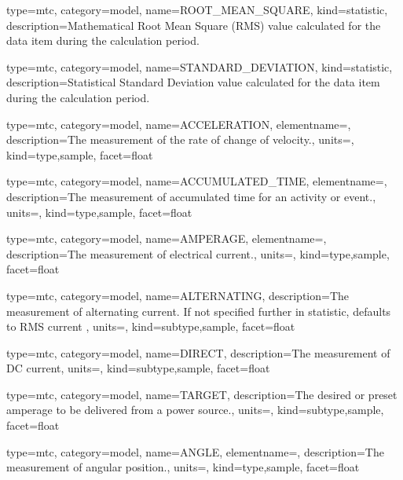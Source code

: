 {
  type=mtc,
  category=model,
  name={ROOT\_MEAN\_SQUARE},
  kind={statistic},
  description={Mathematical Root Mean Square (RMS) value calculated for the data item during the calculation period.}
}


{
  type=mtc,
  category=model,
  name={STANDARD\_DEVIATION},
  kind={statistic},
  description={Statistical Standard Deviation value calculated for the data item during the calculation period.}
}


{
  type=mtc,
  category=model,
  name={ACCELERATION},
  elementname=,
  description={The measurement of the rate of change of velocity.},
  units=,
  kind={type,sample},
  facet={\gls{float}}
}


{
  type=mtc,
  category=model,
  name={ACCUMULATED\_TIME},
  elementname=,
  description={The measurement of accumulated time for an activity or event.},
  units=,
  kind={type,sample},
  facet={\gls{float}}
}


{
  type=mtc,
  category=model,
  name={AMPERAGE},
  elementname=,
  description={The measurement of electrical current.},
  units=,
  kind={type,sample},
  facet={\gls{float}}
}



{
  type=mtc,
  category=model,
  name={ALTERNATING},
  description={The measurement of alternating current.   If not specified further in statistic, defaults to RMS current  },
  units=,
  kind={subtype,sample},
  facet={\gls{float}}
}


{
  type=mtc,
  category=model,
  name={DIRECT},
  description={The measurement of DC current},
  units=,
  kind={subtype,sample},
  facet={\gls{float}}
}


{
  type=mtc,
  category=model,
  name={TARGET},
  description={The desired or preset amperage to be delivered from a power source.},
  units=,
  kind={subtype,sample},
  facet={\gls{float}}
}


{
  type=mtc,
  category=model,
  name={ANGLE},
  elementname=,
  description={The measurement of angular position.},
  units=,
  kind={type,sample},
  facet={\gls{float}}
}


